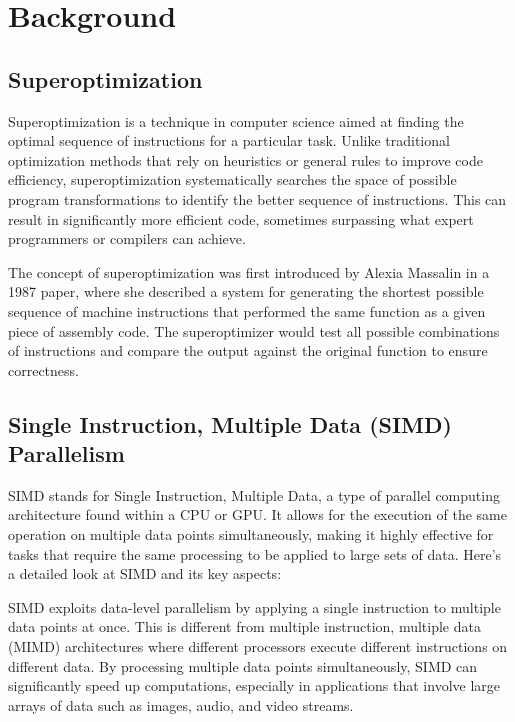 
\chapter{Background}
\label{chap:background}


\section{Superoptimization}
\label{sec:superoptimization}


Superoptimization is a technique in computer science aimed at finding
the optimal sequence of instructions for a particular task.
%
 Unlike traditional optimization methods that rely on heuristics or
general rules to improve code efficiency, superoptimization
systematically searches the space of possible program transformations
to identify the better sequence of instructions.
%
This can result in significantly more efficient code, sometimes
surpassing what expert programmers or compilers can achieve.


The concept of superoptimization was first introduced by Alexia
Massalin in a 1987 paper, where she described a system for generating
the shortest possible sequence of machine instructions that performed
the same function as a given piece of assembly code. The
superoptimizer would test all possible combinations of instructions
and compare the output against the original function to ensure
correctness.





\section{Single Instruction, Multiple Data (SIMD) Parallelism}
\label{sec:simd}

SIMD stands for Single Instruction, Multiple Data, a type of parallel
computing architecture found within a CPU or GPU. It allows for the
execution of the same operation on multiple data points
simultaneously, making it highly effective for tasks that require the
same processing to be applied to large sets of data. Here's a detailed
look at SIMD and its key aspects:

SIMD exploits data-level parallelism by applying a single instruction
to multiple data points at once. This is different from multiple
instruction, multiple data (MIMD) architectures where different
processors execute different instructions on different data. By
processing multiple data points simultaneously, SIMD can significantly
speed up computations, especially in applications that involve large
arrays of data such as images, audio, and video streams.

